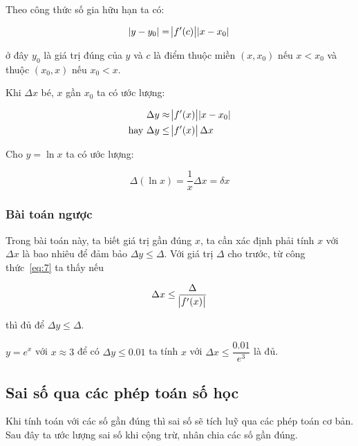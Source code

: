 \documentclass[../../Lectures.tex]{subfiles}
\begin{document}
Theo công thức số gia hữu hạn ta có:

\[\abs{y - y_0} = \abs{f'(c)}\abs{x - x_0}\]

ở đây \(y_0\) là giá trị đúng của \(y\) và \(c\) là điểm thuộc miền \((x, x_0)\)
nếu \(x < x_0\) và thuộc \((x_0, x)\) nếu \(x_0 < x\).

Khi \(\Delta x\) bé, \(x\) gần \(x_0\) ta có ước lượng:

\begin{equation} \label{eq:7}
    \begin{aligned}
                    &\Delta y \approx \abs{f'(x)}\abs{x - x_0} \\
        \text{hay } &\Delta y \leq \abs{f'(x)}\Delta x
    \end{aligned}
\end{equation}

\begin{exmp}
    Cho \(y = \ln{x}\) ta có ước lượng:

    \[\Delta(\ln{x}) = \frac{1}{x} \Delta x = \delta x\]
\end{exmp}

\subsubsection{Bài toán ngược}

Trong bài toán này, ta biết giá trị gần đúng \(x\), ta cần xác định phải tính
\(x\) với \(\Delta x\) là bao nhiêu để đảm bảo \(\Delta y \leq \Delta\). Với giá
trị \(\Delta\) cho trước, từ công thức~\ref{eq:7} ta thấy nếu

\begin{equation} \label{eq:approx_of_relative_error}
    \Delta x \leq \frac{\Delta}{\abs{f'(x)}}
\end{equation}

thì đủ để \(\Delta y \leq \Delta\).

\begin{exmp}
    \(y = e^x\) với \(x \approx 3\) để có \(\Delta y \leq \num{0.01}\) ta tính
    \(x\) với \(\Delta x \leq \dfrac{\num{0.01}}{e^3}\) là đủ.
\end{exmp}

\subsection{Sai số qua các phép toán số học}

Khi tính toán với các số gần đúng thì sai số sẽ tích luỹ qua các phép toán cơ
bản. Sau đây ta ước lượng sai số khi cộng trừ, nhân chia các số gần đúng.
\end{document}
